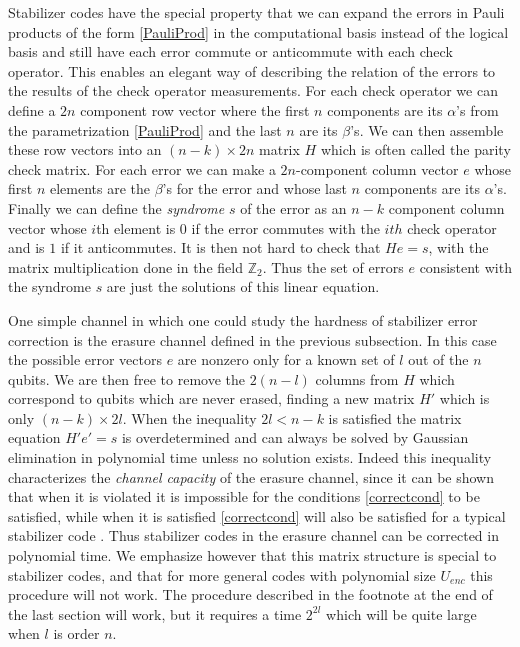 \documentclass[12pt]{article}
\begin{document}
Stabilizer codes have the special property that we can expand the errors in Pauli products of the form \eqref{PauliProd} in the computational basis instead of the logical basis and still have each error commute or anticommute with each check operator.  This enables an elegant way of describing the relation of the errors to the results of the check operator measurements.  For each check operator we can define a $2n$ component row vector where the first $n$ components are its $\alpha$'s from the parametrization \eqref{PauliProd} and the last $n$ are its $\beta$'s.   We can then assemble these row vectors into an $(n-k)\times 2n$ matrix $H$ which is often called the parity check matrix.  For each error we can make a $2n$-component column vector $e$ whose first $n$ elements are the $\beta$'s for the error and whose last $n$ components are its $\alpha$'s.  Finally we can define the \textit{syndrome} $s$ of the error as an $n-k$ component column vector whose $i$th element is $0$ if the error commutes with the $ith$ check operator and is $1$ if it anticommutes.  It is then not hard to check that $He=s$, with the matrix multiplication done in the field $\mathbb{Z}_2$.  Thus the set of errors $e$ consistent with the syndrome $s$ are just the solutions of this linear equation.  

One simple channel in which one could study the hardness of stabilizer error correction is the erasure channel defined in the previous subsection.  In this case the possible error vectors $e$ are nonzero only for a known set of $l$ out of the $n$ qubits.  We are then free to remove the $2(n-l)$ columns from $H$ which correspond to qubits which are never erased, finding a new matrix $H'$ which is only $(n-k)\times 2l$.  When the inequality $2l<n-k$ is satisfied the matrix equation $H'e'=s$ is overdetermined and can always be solved by Gaussian elimination in polynomial time unless no solution exists.  Indeed this inequality characterizes the \textit{channel capacity} of the erasure channel, since it can be shown that when it is violated it is impossible for the conditions \eqref{correctcond} to be satisfied, while when it is satisfied \eqref{correctcond} will also be satisfied for a typical stabilizer code \cite{preskillnotes}.  Thus stabilizer codes in the erasure channel can be corrected in polynomial time.  We emphasize however that this matrix structure is special to stabilizer codes, and that for more general codes with polynomial size $U_{enc}$ this procedure will not work.  The procedure described in the footnote at the end of the last section will work, but it requires a time $2^{2l}$ which will be quite large when $l$ is order $n$.
\end{document}
